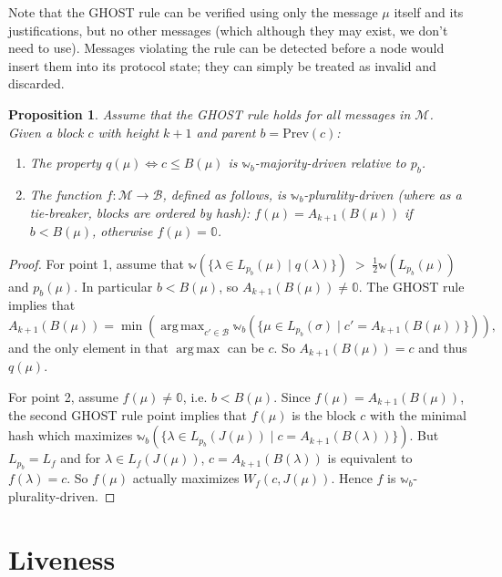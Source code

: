 \documentclass[12pt, fleqn]{article}
\newtheorem{proposition}{Proposition}
\newcommand{\ww}{\mathbb{w}}
\DeclareMathOperator*{\argmax}{arg\,max}
\begin{document}
Note that the GHOST rule can be verified using only the message $\mu$ itself and its justifications, but no other messages (which although they may exist, we don't need to use). Messages violating the rule can be detected before a node would insert them into its protocol state; they can simply be treated as invalid and discarded.

\begin{proposition}\label{ghostPlurality}
  Assume that the GHOST rule holds for all messages in $\mathcal{M}$. Given a block $c$ with height $k + 1$ and parent $b = \mathrm{Prev}(c)$:
  \begin{enumerate}
    \item The property $q(\mu) \Leftrightarrow c \leq B(\mu)$ is $\ww_b$-majority-driven relative to $p_b$.
    \item The function $f : \mathcal{M} \rightarrow \mathcal{B}$, defined as follows, is $\ww_b$-plurality-driven (where as a tie-breaker, blocks are ordered by hash):
      $f(\mu) = A_{k+1}(B(\mu))$ if $b < B(\mu)$, otherwise $f(\mu) = \mathbb{0}$.
  \end{enumerate}
\end{proposition}

\begin{proof}
  For point 1, assume that $\ww (\{\lambda \in L_{p_b}(\mu) \mid q(\lambda) \}) \;>\; \frac{1}{2} \ww(L_{p_b}(\mu))$ and $p_b(\mu)$. In particular $b < B(\mu)$, so $A_{k + 1} (B(\mu)) \neq \mathbb{0}$. The GHOST rule implies that
  $$A_{k + 1}(B(\mu)) = \min \left(\argmax_{c'\in\mathcal{B}} \ww_b(\{\mu \in L_{p_b} (\sigma) \mid c' = A_{k + 1}(B(\mu))\})\right)\textrm{,}$$
  and the only element in that $\argmax$ can be $c$. So $A_{k + 1}(B(\mu)) = c$ and thus $q(\mu)$.

  For point 2, assume $f(\mu) \neq \mathbb{0}$, i.e. $b < B(\mu)$. Since $f(\mu) = A_{k+1}(B(\mu))$, the second GHOST rule point implies that $f(\mu)$ is the block $c$ with the minimal hash which maximizes $\ww_b(\{\lambda \in L_{p_b} (J(\mu)) \mid c = A_{k + 1}(B(\lambda))\})$. But $L_{p_b} = L_f$ and for $\lambda \in L_f (J(\mu))$, $c = A_{k+1}(B(\lambda))$ is equivalent to $f(\lambda) = c$. So $f(\mu)$ actually maximizes $W_f(c, J(\mu))$. Hence $f$ is $\ww_b$-plurality-driven.
\end{proof}


\section{Liveness}
\label{sectionLiveness}
\end{document}
